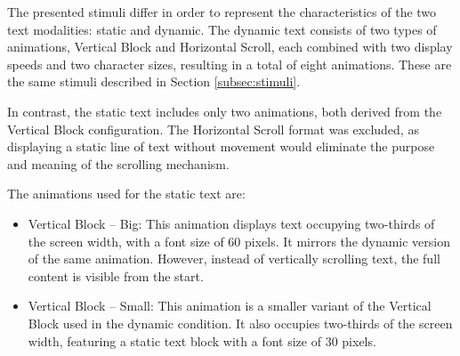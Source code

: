 \documentclass[12pt]{report}
\begin{document}
The presented stimuli differ in order to represent the characteristics of the two text modalities: static and dynamic.
The dynamic text consists of two types of animations, Vertical Block and Horizontal Scroll, each combined with two display speeds and two character sizes, resulting in a total of eight animations. 
These are the same stimuli described in Section \ref{subsec:stimuli}.

In contrast, the static text includes only two animations, both derived from the Vertical Block configuration.
The Horizontal Scroll format was excluded, as displaying a static line of text without movement would eliminate the purpose and meaning of the scrolling mechanism.

The animations used for the static text are:
\begin{itemize}
\item Vertical Block – Big: This animation displays text occupying two-thirds of the screen width, with a font size of 60 pixels. 
It mirrors the dynamic version of the same animation.
However, instead of vertically scrolling text, the full content is visible from the start.
\item Vertical Block – Small: This animation is a smaller variant of the Vertical Block used in the dynamic condition. 
It also occupies two-thirds of the screen width, featuring a static text block with a font size of 30 pixels.
\end{itemize}
\end{document}
